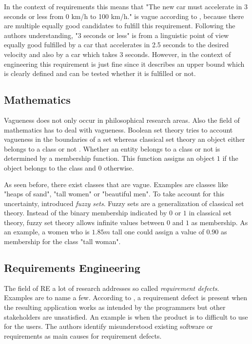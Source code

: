 In the context of requirements this means that "The new car must accelerate in 3 seconds or less from 0 km/h to 100 km/h." is vague according to \textcite{Braun:2007}, because there are multiple equally good candidates to fulfill this requirement.
Following the authors understanding, "3 seconds or less" is from a linguistic point of view equally good fulfilled by a car that accelerates in 2.5 seconds to the desired velocity and also by a car which takes 3 seconds.
However, in the context of engineering this requirement is just fine since it describes an upper bound which is clearly defined and can be tested whether it is fulfilled or not.

\subsection{Mathematics}
\label{chp:fundamentals:sec:vagueness:subsec:mathematics}
Vagueness does not only occur in philosophical research areas.
Also the field of mathematics has to deal with vagueness.
Boolean set theory tries to account vagueness in the boundaries of a set whereas classical set theory an object either belongs to a class or not \parencite{Fisher:2000}.
Whether an entity belongs to a class or not is determined by a membership function.
This function assigns an object $1$ if the object belongs to the class and $0$ otherwise.

As seen before, there exist classes that are vague.
Examples are classes like "heaps of sand", "tall women" or "beautiful men".
To take account for this uncertainty, \textcite{Zadeh:1965} introduced \textit{fuzzy sets}.
Fuzzy sets are a generalization of classical set theory.
Instead of the binary membership indicated by $0$ or $1$ in classical set theory, fuzzy set theory allows infinite values between $0$ and $1$ as membership.
As an example, a women who is $1.85m$ tall one could assign a value of $0.90$ as membership for the class "tall woman".

\subsection{Requirements Engineering}
\label{chp:fundamentals:sec:vagueness:subsec:requirement_engineering}
The field of \ac{RE} a lot of research addresses so called \textit{requirement defects}.
Examples are \textcite{Lauesen:2001,Kosman:1997,Blackburn:2001} to name a few.
According to \textcite{Lauesen:2001}, a requirement defect is present when the resulting application works as intended by the programmers but other stakeholders are unsatisfied.
An example is when the product is to difficult to use for the users.
The authors identify misunderstood existing software or requirements as main causes for requirement defects.


